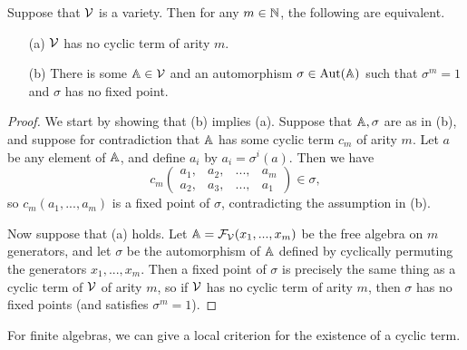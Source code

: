 \documentclass[letterpaper,11pt]{article}
\DeclareMathOperator{\Aut}{Aut}
\begin{document}
\begin{prop} Suppose that $\mathcal{V}$ is a variety. Then for any $m \in \mathbb{N}$, the following are equivalent.
\begin{itemize}
\item[(a)] $\mathcal{V}$ has no cyclic term of arity $m$.
\item[(b)] There is some $\mathbb{A} \in \mathcal{V}$ and an automorphism $\sigma \in \Aut(\bA)$ such that $\sigma^m = 1$ and $\sigma$ has no fixed point.
\end{itemize}
\end{prop}
\begin{proof} We start by showing that (b) implies (a). Suppose that $\mathbb{A}, \sigma$ are as in (b), and suppose for contradiction that $\mathbb{A}$ has some cyclic term $c_m$ of arity $m$. Let $a$ be any element of $\mathbb{A}$, and define $a_i$ by $a_i = \sigma^i(a)$. Then we have
\[
c_m\begin{pmatrix}a_1, & a_2, & ..., & a_m\\ a_2, & a_3, & ..., & a_1\end{pmatrix} \in \sigma,
\]
so $c_m(a_1, ..., a_m)$ is a fixed point of $\sigma$, contradicting the assumption in (b).

Now suppose that (a) holds. Let $\mathbb{A} = \mathcal{F}_{\mathcal{V}}(x_1, ..., x_m)$ be the free algebra on $m$ generators, and let $\sigma$ be the automorphism of $\mathbb{A}$ defined by cyclically permuting the generators $x_1, ..., x_m$. Then a fixed point of $\sigma$ is precisely the same thing as a cyclic term of $\mathcal{V}$ of arity $m$, so if $\mathcal{V}$ has no cyclic term of arity $m$, then $\sigma$ has no fixed points (and satisfies $\sigma^m = 1$).
\end{proof}

For finite algebras, we can give a local criterion for the existence of a cyclic term.
\end{document}
